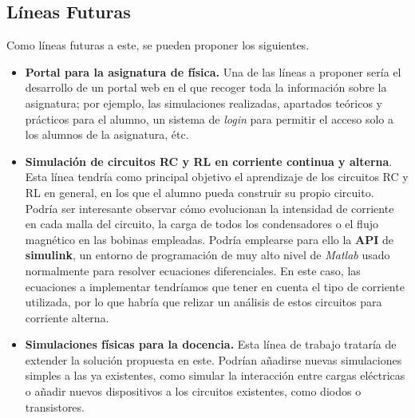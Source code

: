 \documentclass[../main.tex]{subfiles}
\begin{document}
\subsection{Líneas Futuras}
Como líneas futuras a este, se pueden proponer los siguientes.

\begin{itemize}
    \item \textbf{Portal para la asignatura de física. }Una de las líneas a proponer sería el desarrollo de un portal web en el que recoger toda la información sobre la asignatura; por ejemplo, las simulaciones realizadas, apartados teóricos y prácticos para el alumno, un sistema de \textit{login} para permitir el acceso solo a los alumnos de la asignatura, étc. 


    \item \textbf{Simulación de circuitos RC y RL en corriente continua y alterna}. Esta línea tendría como principal objetivo el aprendizaje de los circuitos RC y RL en general, en los que el alumno pueda construir su propio circuito. Podría ser interesante observar cómo evolucionan la intensidad de corriente en cada malla del circuito, la carga de todos los condensadores o el flujo magnético en las bobinas empleadas. Podría emplearse para ello la \textbf{API} de \textbf{simulink}, un entorno de programación de muy alto nivel de \textit{Matlab} usado normalmente para resolver ecuaciones diferenciales. En este caso, las ecuaciones a implementar tendríamos que tener en cuenta el tipo de corriente utilizada, por lo que habría que relizar un análisis de estos circuitos para corriente alterna.
    
    \item \textbf{Simulaciones físicas para la docencia. }Esta línea de trabajo trataría de extender la solución propuesta en este. Podrían añadirse nuevas simulaciones simples a las ya existentes, como simular la interacción entre cargas eléctricas o añadir nuevos dispositivos a los circuitos existentes, como diodos o transistores.
    

\end{itemize}
\end{document}
